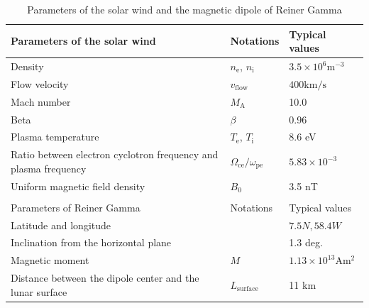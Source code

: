\documentclass[draft,jgrga]{agutex2015}
\begin{document}
\begin{article}
\begin{table}[h]
\caption{Parameters of the solar wind and the magnetic dipole of Reiner Gamma}
\centering
 \begin{tabular}{p{}ll}
 Parameters of the solar wind    &  Notations    &  Typical values \\  \hline           
 Density       & $n_\mathrm{e}$, $n_\mathrm{i}$  &  $3.5 \times 10^6 \mathrm{m^{-3}}$   \\ 
 Flow velocity & $v_\mathrm{flow}$               &  $400  \mathrm{km/s}  $              \\
 Mach number   & $M_\mathrm{A}$                  & 10.0 \\
 Beta          &  $\beta$                        & 0.96 \\
 Plasma temperature & $T_\mathrm{e}$, $T_\mathrm{i}$    &  $8.6$ eV \\
 Ratio between electron cyclotron frequency and plasma frequency & 
  $\Omega_\mathrm{ce}/\omega_\mathrm{pe}$ & $5.83 \times 10^{-3}$ \\ 
 Uniform magnetic field density &  $B_\mathrm{0}$   &   3.5 nT          \\ \hline 
  & & \\ 
 Parameters of Reiner Gamma    &  Notations    &  Typical values \\  \hline           
 Latitude and longitude   &  &  $7.5N, 58.4W$      \\   
 Inclination from the horizontal plane &      &   1.3 deg.         \\            
 Magnetic moment &  $ M $   &  $ 1.13 \times 10^{13} \mathrm{Am^2}$ \\
 Distance between the dipole center and the lunar surface & $L_\mathrm{surface}$ & 11 km \\ \hline
 \end{tabular}
\end{table}



\end{article}
\end{document}
